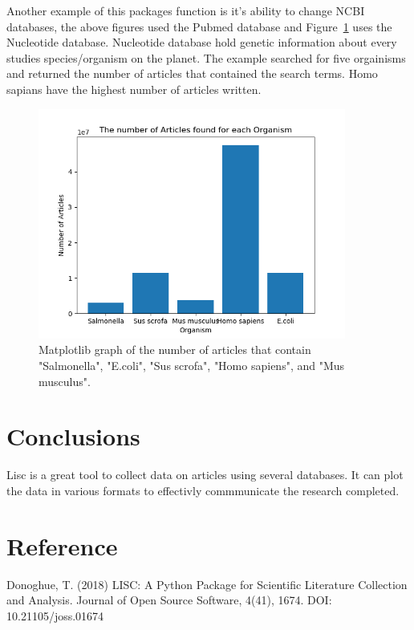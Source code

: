 \documentclass[12pt, letterpaper]{article}
\begin{document}
%
Another example of this packages function is it's ability to change NCBI databases, the above figures used the Pubmed database and Figure~\ref{fig:organism} uses the Nucleotide database. Nucleotide database hold genetic information about every studies species/organism on the planet. The example searched for five orgainisms and returned the number of articles that contained the search terms. Homo sapians have the highest number of articles written.
%
\begin{figure}
  \centering
  \includegraphics[width=0.9\textwidth]{organism}
  \caption{Matplotlib graph of the number of articles that contain "Salmonella", "E.coli", "Sus scrofa", "Homo sapiens", and "Mus musculus".}
  \label{fig:organism}
\end{figure}
%
\section{Conclusions}

Lisc is a great tool to collect data on articles using several databases. It can plot the data in various formats to effectivly commmunicate the research completed.

\section{Reference}

Donoghue, T. (2018) LISC: A Python Package for Scientific Literature Collection and Analysis. Journal of Open Source Software, 4(41), 1674. DOI: 10.21105/joss.01674
\end{document}
